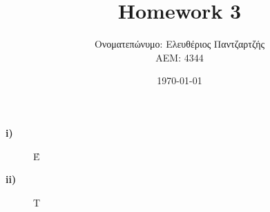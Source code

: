 \documentclass[12pt]{article}
\begin{document}
\centering
\title{Homework 3}
\author{Ονοματεπώνυμο: Ελευθέριος Παντζαρτζής \\  ΑΕΜ: 4344}
\date{\today}
\maketitle
\begin{description}
   \item [\textbf{i)}]  Έ
   
   \item [\textbf{ii)}] Τ
   
\end{description}
\end{document}
